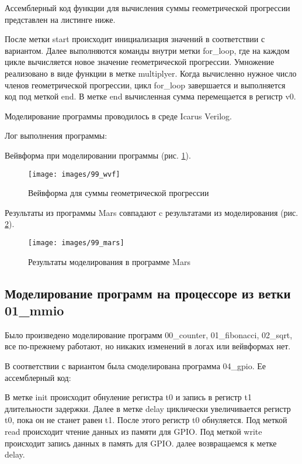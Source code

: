 \documentclass[a4paper,14pt]{article}
\begin{document}
	Ассемблерный код функции для вычисления суммы геометрической прогрессии представлен на листинге ниже.
	
	{\small {}}
	
	После метки start происходит инициализация значений в соответствии с вариантом.
	Далее выполняются команды внутри метки for\_loop, где на каждом цикле вычисляется новое значение геометрической прогрессии.
	Умножение реализовано в виде функции в метке multiplyer.
	Когда вычисленно нужное число членов геометрической прогрессии, цикл for\_loop завершается и выполняется код под меткой end.
	В метке end вычисленная сумма перемещается в регистр v0.
	
	Моделирование программы проводилось в среде Icarus Verilog.
	
	Лог выполнения программы:
	
	{\small {}}
	
	Вейвформа при моделировании программы (рис. \ref{fig:99wvf}).
	
	\begin{figure}[H]
		\centering
		\texttt{[image: images/99\_wvf]}
		\caption{Вейвформа для суммы геометрической прогрессии}
		\label{fig:99wvf}
	\end{figure}

	Результаты из программы Mars совпадают c результатами из моделирования (рис. \ref{fig:99mars}).

	\begin{figure}[H]
		\centering
		\texttt{[image: images/99\_mars]}
		\caption{Результаты моделирования в программе Mars}
		\label{fig:99mars}
	\end{figure}

	\subsection{Моделирование программ на процессоре из ветки 01\_mmio}
	
	Было произведено моделирование программ  00\_counter, 01\_fibonacci, 02\_sqrt, все по-прежнему работают, но никаких изменений в логах или вейвформах нет.
	
	В соответствии с вариантом была смоделирована программа 04\_gpio. Ее ассемблерный код:
	
	{\small {}}
	
	В метке init происходит обнуление регистра t0 и запись в регистр t1 длительности задержки.
	Далее в метке delay циклически увеличивается регистр t0, пока он не станет равен t1.
	После этого регистр t0 обнуляется.
	Под меткой read происходит чтение данных из памяти для GPIO.
	Под меткой write происходит запись данных в память для GPIO.
	далее возвращаемся к метке delay.
	
\end{document}
